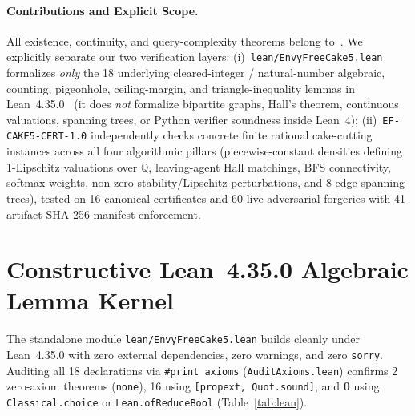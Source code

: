 \documentclass[10pt,twocolumn]{article}
\newcommand{\QQ}{\mathbb{Q}}
\begin{document}
\paragraph{Contributions and Explicit Scope.}
All existence, continuity, and query-complexity theorems belong to~\cite{filosratsikas2026envyfree5}. We explicitly separate our two verification layers:
(i)~\texttt{lean/EnvyFreeCake5.lean} formalizes \emph{only} the 18 underlying cleared-integer / natural-number algebraic, counting, pigeonhole, ceiling-margin, and triangle-inequality lemmas in Lean~4.35.0~\cite{demoura2021lean4} (it does \emph{not} formalize bipartite graphs, Hall's theorem, continuous valuations, spanning trees, or Python verifier soundness inside Lean~4);
(ii)~\texttt{EF-CAKE5-CERT-1.0} independently checks concrete finite rational cake-cutting instances across all four algorithmic pillars (piecewise-constant densities defining 1-Lipschitz valuations over $\QQ$, leaving-agent Hall matchings, BFS connectivity, softmax weights, non-zero stability/Lipschitz perturbations, and 8-edge spanning trees), tested on 16 canonical certificates and 60 live adversarial forgeries with 41-artifact SHA-256 manifest enforcement.

\section{Constructive Lean~4.35.0 Algebraic Lemma Kernel}\label{sec:lean}
The standalone module \texttt{lean/EnvyFreeCake5.lean} builds cleanly under Lean~4.35.0 with zero external dependencies, zero warnings, and zero \texttt{sorry}. Auditing all 18 declarations via \texttt{\#print axioms} (\texttt{AuditAxioms.lean}) confirms 2 zero-axiom theorems (\texttt{none}), 16 using \texttt{[propext, Quot.sound]}, and \textbf{0} using \texttt{Classical.choice} or \texttt{Lean.ofReduceBool} (Table~\ref{tab:lean}).
\end{document}
